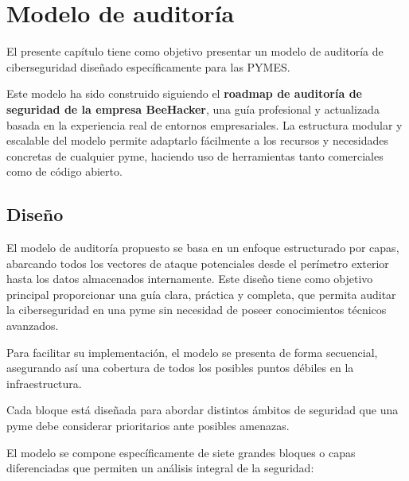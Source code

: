 \documentclass[a4paper, 10pt]{article}
\begin{document}
\section{Modelo de auditoría}

El presente capítulo tiene como objetivo presentar un modelo de auditoría de ciberseguridad diseñado específicamente para las PYMES. 

\par\vspace{0.5cm}


Este modelo ha sido construido siguiendo el \textbf{roadmap de auditoría de seguridad de la empresa BeeHacker}, una guía profesional y actualizada basada en la experiencia real de entornos empresariales. La estructura modular y escalable del modelo permite adaptarlo fácilmente a los recursos y necesidades concretas de cualquier pyme, haciendo uso de herramientas tanto comerciales como de código abierto.





\subsection{Diseño}

El modelo de auditoría propuesto se basa en un enfoque estructurado por capas, abarcando todos los vectores de ataque potenciales desde el perímetro exterior hasta los datos almacenados internamente. Este diseño tiene como objetivo principal proporcionar una guía clara, práctica y completa, que permita auditar la ciberseguridad en una pyme sin necesidad de poseer conocimientos técnicos avanzados. 




Para facilitar su implementación, el modelo se presenta de forma  secuencial, asegurando así una cobertura de todos los posibles puntos débiles en la infraestructura.
\par\vspace{0.5cm}

Cada bloque está diseñada para abordar distintos ámbitos de seguridad que una pyme debe considerar prioritarios ante posibles amenazas.

\par\vspace{0.5cm}

El modelo se compone específicamente de siete grandes bloques o capas diferenciadas que permiten un análisis integral de la seguridad:
\end{document}
